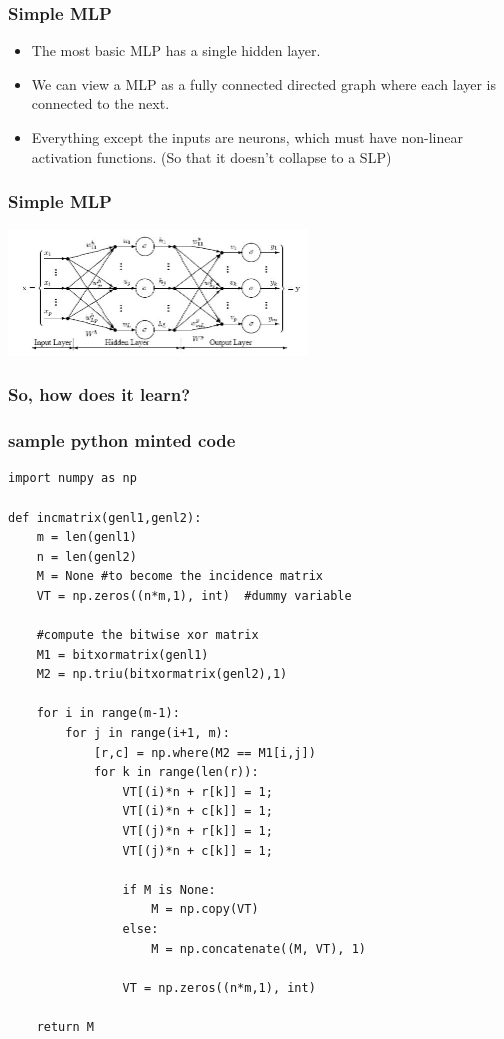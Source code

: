 \documentclass{beamer}
\begin{document}
\begin{frame}
\frametitle{Simple MLP}
\begin{itemize}
\item The most basic MLP has a single hidden layer.
\item We can view a MLP as a fully connected directed graph where each layer is connected to the next.
\item Everything except the inputs are neurons, which must have non-linear activation functions. (So that it doesn't collapse to a SLP)
\end{itemize}
\end{frame}
\begin{frame}
\frametitle{Simple MLP}

\includegraphics[width=300px]{mls.jpg}

\end{frame}

\begin{frame}	
\frametitle{So, how does it learn?}
\end{frame}

\begin{frame}
\frametitle{sample python minted code}
\begin{verbatim}
import numpy as np
 
def incmatrix(genl1,genl2):
    m = len(genl1)
    n = len(genl2)
    M = None #to become the incidence matrix
    VT = np.zeros((n*m,1), int)  #dummy variable
 
    #compute the bitwise xor matrix
    M1 = bitxormatrix(genl1)
    M2 = np.triu(bitxormatrix(genl2),1) 
 
    for i in range(m-1):
        for j in range(i+1, m):
            [r,c] = np.where(M2 == M1[i,j])
            for k in range(len(r)):
                VT[(i)*n + r[k]] = 1;
                VT[(i)*n + c[k]] = 1;
                VT[(j)*n + r[k]] = 1;
                VT[(j)*n + c[k]] = 1;
 
                if M is None:
                    M = np.copy(VT)
                else:
                    M = np.concatenate((M, VT), 1)
 
                VT = np.zeros((n*m,1), int)
 
    return M
\end{verbatim}
\end{frame}
\end{document}
